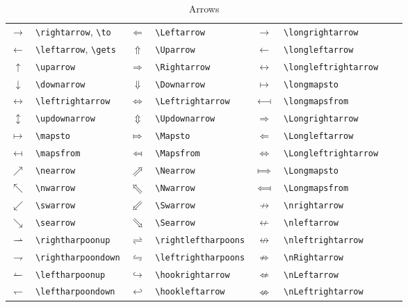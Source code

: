 \documentclass[captions=tableheading]{scrartcl}
\begin{document}
\begin{table}
  \caption{Arrows}
  \label{tab:arrows}
  \centering
  \begin{tabular}[c]{clclclcl}
    \toprule
    $\rightarrow$ & \verb|\rightarrow|, \verb|\to| &
    $\Leftarrow$ & \verb|\Leftarrow| &
    $\longrightarrow$ & \verb|\longrightarrow| \\
    $\leftarrow$ & \verb|\leftarrow|, \verb|\gets| &
    $\Uparrow$ & \verb|\Uparrow| &
    $\longleftarrow$ & \verb|\longleftarrow| \\
    $\uparrow$ & \verb|\uparrow| &
    $\Rightarrow$ & \verb|\Rightarrow| &
    $\longleftrightarrow$ & \verb|\longleftrightarrow| \\
    $\downarrow$ & \verb|\downarrow| &
    $\Downarrow$ & \verb|\Downarrow| &
    $\longmapsto$ & \verb|\longmapsto| \\
    \addlinespace
    $\leftrightarrow$ & \verb|\leftrightarrow| &
    $\Leftrightarrow$ & \verb|\Leftrightarrow| &
    $\longmapsfrom$ & \verb|\longmapsfrom| \\
    $\updownarrow$ & \verb|\updownarrow| &
    $\Updownarrow$ & \verb|\Updownarrow| &
    $\Longrightarrow$ & \verb|\Longrightarrow| \\
    $\mapsto$ & \verb|\mapsto| &
    $\Mapsto$ & \verb|\Mapsto| &
    $\Longleftarrow$ & \verb|\Longleftarrow| \\
    $\mapsfrom$ & \verb|\mapsfrom| &
    $\Mapsfrom$ & \verb|\Mapsfrom| &
    $\Longleftrightarrow$ & \verb|\Longleftrightarrow| \\
    \addlinespace
    $\nearrow$ & \verb|\nearrow| &
    $\Nearrow$ & \verb|\Nearrow| &
    $\Longmapsto$ & \verb|\Longmapsto| \\
    $\nwarrow$ & \verb|\nwarrow| &
    $\Nwarrow$ & \verb|\Nwarrow| &
    $\Longmapsfrom$ & \verb|\Longmapsfrom| \\
    $\swarrow$ & \verb|\swarrow| &
    $\Swarrow$ & \verb|\Swarrow| &
    $\nrightarrow$ & \verb|\nrightarrow| \\
    $\searrow$ & \verb|\searrow| &
    $\Searrow$ & \verb|\Searrow| &
    $\nleftarrow$ & \verb|\nleftarrow| \\
    \addlinespace
    $\rightharpoonup$ & \verb|\rightharpoonup| &
    $\rightleftharpoons$ & \verb|\rightleftharpoons| &
    $\nleftrightarrow$ & \verb|\nleftrightarrow| \\
    $\rightharpoondown$ & \verb|\rightharpoondown| &
    $\leftrightharpoons$ & \verb|\leftrightharpoons| &
    $\nRightarrow$ & \verb|\nRightarrow| \\
    $\leftharpoonup$ & \verb|\leftharpoonup| &
    $\hookrightarrow$ & \verb|\hookrightarrow| &
    $\nLeftarrow$ & \verb|\nLeftarrow| \\
    $\leftharpoondown$ & \verb|\leftharpoondown| &
    $\hookleftarrow$ & \verb|\hookleftarrow| &
    $\nLeftrightarrow$ & \verb|\nLeftrightarrow| \\
    \bottomrule
  \end{tabular}
\end{table}
\end{document}
